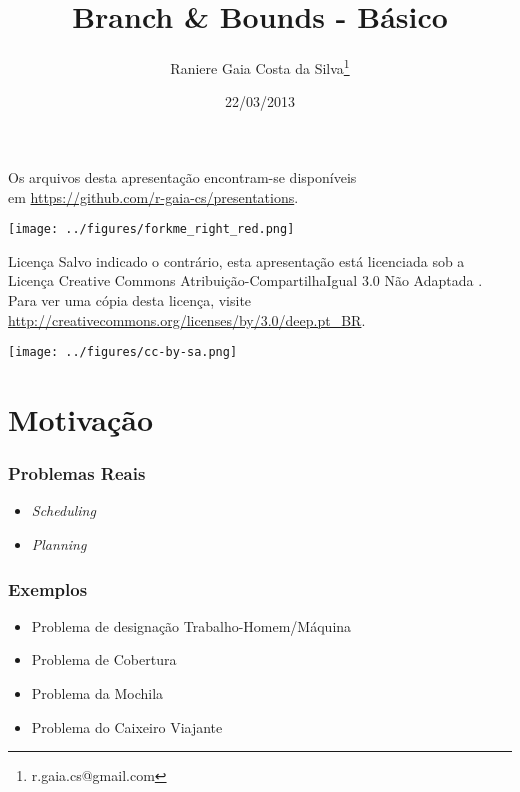 \documentclass[11pt]{beamer}
\newcommand{\flang}[1]{\textit{#1}}
\begin{document}
\title[Branch \& Bounds - Básico]{Branch \& Bounds - Básico}
\author[Raniere Silva]{Raniere Gaia Costa da
Silva\footnote{r.gaia.cs@gmail.com}}
\date{22/03/2013}

\begin{frame}
  \maketitle
\end{frame}

\begin{frame}
  \begin{block}{}
    Os arquivos desta apresentação encontram-se disponíveis \\
    em \url{https://github.com/r-gaia-cs/presentations}. \\
    \vspace{-33pt}
    \begin{flushright}
      \texttt{[image: ../figures/forkme\_right\_red.png]}
    \end{flushright}
  \end{block}

  \begin{block}{Licença}
    Salvo indicado o contrário, esta apresentação está licenciada sob a
    Licença Creative Commons Atribuição-CompartilhaIgual 3.0 Não Adaptada .
    Para ver uma cópia desta licença, visite
    \url{http://creativecommons.org/licenses/by/3.0/deep.pt_BR}.
    \begin{center}
      \texttt{[image: ../figures/cc-by-sa.png]}
    \end{center}
  \end{block}
\end{frame}

\begin{frame}
    \tableofcontents
\end{frame}

\section{Motivação}
\begin{frame}
  \frametitle{Problemas Reais}
  \begin{itemize}
    \item \flang{Scheduling}
    \item \flang{Planning}
  \end{itemize}
\end{frame}

\begin{frame}
  \frametitle{Exemplos}
  \begin{itemize}
    \item Problema de designação Trabalho-Homem/Máquina
    \item Problema de Cobertura
    \item Problema da Mochila
    \item Problema do Caixeiro Viajante
  \end{itemize}
\end{frame}
\end{document}
